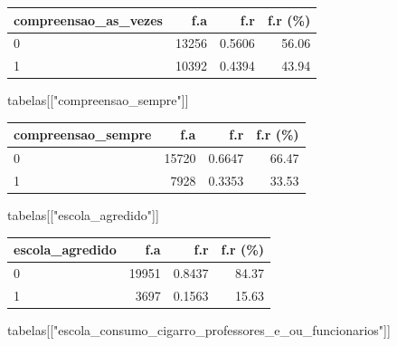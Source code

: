 \documentclass[
]{article}
\newenvironment{Shaded}{\begin{snugshade}}{\end{snugshade}}
\newcommand{\NormalTok}[1]{\textcolor[rgb]{0.00,0.23,0.31}{#1}}
\newcommand{\StringTok}[1]{\textcolor[rgb]{0.13,0.47,0.30}{#1}}
\begin{document}
\begin{longtable}[]{@{}lrrr@{}}
\toprule()
compreensao\_as\_vezes & f.a & f.r & f.r (\%) \\
\midrule()
\endhead
0 & 13256 & 0.5606 & 56.06 \\
1 & 10392 & 0.4394 & 43.94 \\
\bottomrule()
\end{longtable}

\begin{Shaded}
\begin{Highlighting}[]
\NormalTok{tabelas[[}\StringTok{"compreensao\_sempre"}\NormalTok{]]}
\end{Highlighting}
\end{Shaded}

\begin{longtable}[]{@{}lrrr@{}}
\toprule()
compreensao\_sempre & f.a & f.r & f.r (\%) \\
\midrule()
\endhead
0 & 15720 & 0.6647 & 66.47 \\
1 & 7928 & 0.3353 & 33.53 \\
\bottomrule()
\end{longtable}

\begin{Shaded}
\begin{Highlighting}[]
\NormalTok{tabelas[[}\StringTok{"escola\_agredido"}\NormalTok{]]}
\end{Highlighting}
\end{Shaded}

\begin{longtable}[]{@{}lrrr@{}}
\toprule()
escola\_agredido & f.a & f.r & f.r (\%) \\
\midrule()
\endhead
0 & 19951 & 0.8437 & 84.37 \\
1 & 3697 & 0.1563 & 15.63 \\
\bottomrule()
\end{longtable}

\begin{Shaded}
\begin{Highlighting}[]
\NormalTok{tabelas[[}\StringTok{"escola\_consumo\_cigarro\_professores\_e\_ou\_funcionarios"}\NormalTok{]]}
\end{Highlighting}
\end{Shaded}
\end{document}

